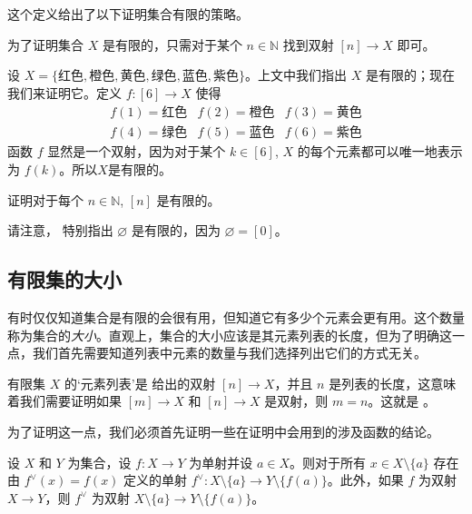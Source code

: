 这个定义给出了以下证明集合有限的策略。

\begin{strategy}[证明一个集合是有限集]
为了证明集合 $X$ 是有限的，只需对于某个 $n \in \mathbb{N}$ 找到双射 $[n] \to X$ 即可。
\end{strategy}

\begin{example}
\label{exSomeFiniteSets}
设 $X = \{ \text{红色}, \text{橙色}, \text{黄色}, \text{绿色}, \text{蓝色}, \text{紫色} \}$。上文中我们指出 $X$ 是有限的；现在我们来证明它。定义 $f : [6] \to X$ 使得
\[ \begin{matrix}
f(1) = \text{红色} & f(2) = \text{橙色} & f(3) = \text{黄色} \\
f(4) = \text{绿色} & f(5) = \text{蓝色} & f(6) = \text{紫色}
\end{matrix} \]
函数 $f$ 显然是一个双射，因为对于某个 $k \in [6]$, $X$ 的每个元素都可以唯一地表示为 $f(k)$。所以$X$是有限的。
\end{example}

\begin{exercise}
\label{exBracketNIsFinite}
证明对于每个 $n \in \mathbb{N}$, $[n]$ 是有限的。
\end{exercise}

请注意， 特别指出 $\varnothing$ 是有限的，因为 $\varnothing = [0]$。

\subsection*{有限集的大小}

有时仅仅知道集合是有限的会很有用，但知道它有多少个元素会更有用。这个数量称为集合的\textit{大小}。直观上，集合的大小应该是其元素列表的长度，但为了明确这一点，我们首先需要知道列表中元素的数量与我们选择列出它们的方式无关。

有限集 $X$ 的`元素列表'是  给出的双射 $[n] \to X$，并且 $n$ 是列表的长度，这意味着我们需要证明如果 $[m] \to X$ 和 $[n] \to X$ 是双射，则 $m=n$。这就是 。

为了证明这一点，我们必须首先证明一些在证明中会用到的涉及函数的结论。

\begin{lemma}
\label{lemRemoveElementFromDomainAndCodomain}
设 $X$ 和 $Y$ 为集合，设 $f : X \to Y$ 为单射并设 $a \in X$。则对于所有 $x \in X \setminus \{ a \}$ 存在由 $f^{\vee}(x) = f(x)$ 定义的单射 $f^{\vee} : X \setminus \{ a \} \to Y \setminus \{ f(a) \}$。此外，如果 $f$ 为双射 $X \to Y$，则 $f^{\vee}$ 为双射 $X \setminus \{ a \} \to Y \setminus \{ f(a) \}$。
\end{lemma}

